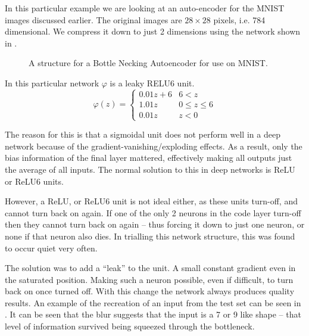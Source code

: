 \documentclass[12pt,parskip]{komatufte}
\begin{document}
In this particular example we are looking at an auto-encoder for the MNIST images discussed earlier.
The original images are $28 \times 28$ pixels, i.e. 784 dimensional.
We compress it down to just 2 dimensions using the network shown in .


\begin{figure}
	\caption{A structure for a Bottle Necking Autoencoder for use on MNIST.}
	\label{fig-autoencoder}
	\resizebox{\textwidth}{!}{}
\end{figure}

\FloatBarrier
In this particular network $\varphi$ is a leaky RELU6 unit.
\begin{equation}
\varphi(z)=\begin{cases}
0.01z+6 & 6<z \\
1.01z & 0 \le z \le 6 \\
0.01z & z < 0
\end{cases}
\end{equation}

The reason for this is that a sigmoidal unit does not perform well in a deep network because of the gradient-vanishing/exploding effects.
As a result, only the bias information of the final layer mattered, effectively making all outputs just the average of all inputs.
The normal solution to this in deep networks is ReLU or ReLU6 units.

\FloatBarrier

However, a ReLU, or ReLU6 unit is not ideal either,
as these units turn-off, and cannot turn back on again.
If one of the only 2 neurons in the code layer turn-off then they cannot turn back on again -- thus forcing it down to just one neuron, or none if that neuron also dies.
In trialling this network structure, this was found to occur quiet very often.

The solution was to add a ``leak'' to the unit.
A small constant gradient even in the saturated position.
Making such a neuron possible, even if difficult, to turn back on once turned off.
With this change the network always produces quality results.
An example of the recreation of an input from the test set can be seen in 
. 
It can be seen that the blur suggests that the input is a 7 or 9 like shape -- that level of information survived being squeezed through the bottleneck.
\end{document}
